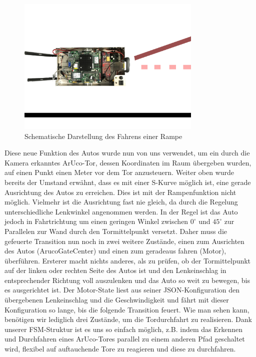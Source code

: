 \begin{figure}[htbp] 
	\centering
	\includegraphics[width=250pt]{images/scharfeRampe.png}
	\caption{Schematische Darstellung des Fahrens einer Rampe}
	\label{fig:ScharfeRampe}
\end{figure}

Diese neue Funktion des Autos wurde nun von uns verwendet, um ein durch die Kamera erkanntes ArUco-Tor, dessen Koordinaten im Raum übergeben wurden, auf einen Punkt einen Meter vor dem Tor anzusteuern.
Weiter oben wurde bereits der Umstand erwähnt, dass es mit einer S-Kurve möglich ist, eine gerade Ausrichtung des Autos zu erreichen. Dies ist mit der Rampenfunktion nicht möglich. Vielmehr ist die Ausrichtung fast nie gleich, da durch die Regelung unterschiedliche Lenkwinkel angenommen werden. In der Regel ist das Auto jedoch in Fahrtrichtung um einen geringen Winkel zwischen $0^\circ$ und $45^\circ$ zur Parallelen zur Wand durch den Tormittelpunkt versetzt. Daher muss die gefeuerte Transition nun noch in zwei weitere Zustände, einen zum Ausrichten des Autos (ArucoGateCenter) und einen zum geradeaus fahren (Motor), überführen. Ersterer macht nichts anderes, als zu prüfen, ob der Tormittelpunkt auf der linken oder rechten Seite des Autos ist und den Lenkeinschlag in entsprechender Richtung voll auszulenken und das Auto so weit zu bewegen, bis es ausgerichtet ist. Der Motor-State liest aus seiner JSON-Konfiguration den übergebenen Lenkeinschlag und die Geschwindigkeit und fährt mit dieser Konfiguration so lange, bis die folgende Transition feuert. 
\newline
\newline
Wie man sehen kann, benötigen wir lediglich drei Zustände, um die Tordurchfahrt zu realisieren. Dank unserer FSM-Struktur ist es uns so einfach möglich, z.B. indem das Erkennen und Durchfahren eines ArUco-Tores parallel zu einem anderen Pfad geschaltet wird, flexibel auf auftauchende Tore zu reagieren und diese zu durchfahren. 
  
